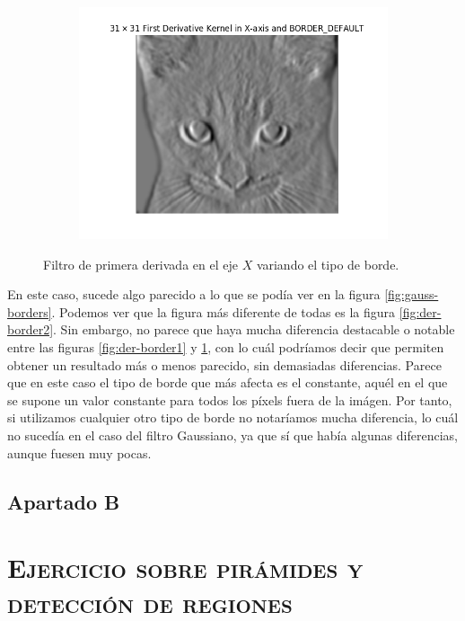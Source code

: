 \documentclass[11pt,a4paper]{article}
\begin{document}
\begin{figure}[H]
\begin{subfigure}{\textwidth}
	\includegraphics[scale=0.44]{img/der-border3.png}
	\label{fig:der-border3}
\end{subfigure}
\caption{Filtro de primera derivada en el eje $X$ variando el tipo de borde.}
\label{fig:der-border}
\end{figure}

En este caso, sucede algo parecido a lo que se podía ver en la figura \ref{fig:gauss-borders}. Podemos ver que
la figura más diferente de todas es la figura \ref{fig:der-border2}. Sin embargo, no parece que haya mucha diferencia
destacable o notable entre las figuras \ref{fig:der-border1} y \ref{fig:der-border3}, con lo cuál podríamos decir que
permiten obtener un resultado más o menos parecido, sin demasiadas diferencias. Parece que en este caso el tipo
de borde que más afecta es el constante, aquél en el que se supone un valor constante para todos los píxels fuera de la imágen.
Por tanto, si utilizamos cualquier otro tipo de borde no notaríamos mucha diferencia, lo cuál no sucedía en el caso del
filtro Gaussiano, ya que sí que había algunas diferencias, aunque fuesen muy pocas.

\subsection{Apartado B}

\newpage

\section{\textsc{Ejercicio sobre pirámides y detección de regiones}}
\end{document}
